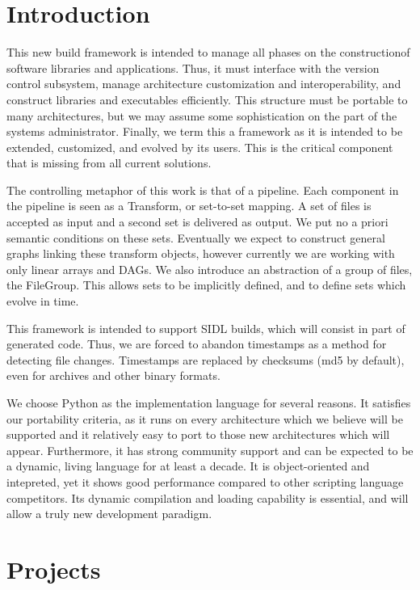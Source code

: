 \section{Introduction}

This new build framework is intended to manage all phases on the constructionof software libraries and
applications. Thus, it must interface with the version control subsystem, manage architecture customization and
interoperability, and construct libraries and executables efficiently. This structure must be portable to many
architectures, but we may assume some sophistication on the part of the systems administrator. Finally, we term this a
framework as it is intended to be extended, customized, and evolved by its users. This is the critical component that is
missing from all current solutions.

The controlling metaphor of this work is that of a pipeline. Each component in the pipeline is seen as a Transform, or
set-to-set mapping. A set of files is accepted as input and a second set is delivered as output. We put no a priori
semantic conditions on these sets. Eventually we expect to construct general graphs linking these transform objects,
however currently we are working with only linear arrays and DAGs. We also introduce an abstraction of a group of files,
the FileGroup. This allows sets to be implicitly defined, and to define sets which evolve in time.

This framework is intended to support SIDL builds, which will consist in part of generated code. Thus, we are forced to
abandon timestamps as a method for detecting file changes. Timestamps are replaced by checksums (md5 by default), even
for archives and other binary formats.

We choose Python as the implementation language for several reasons. It satisfies our portability criteria, as it runs
on every architecture which we believe will be supported and it relatively easy to port to those new architectures which
will appear. Furthermore, it has strong community support and can be expected to be a dynamic, living language for at
least a decade. It is object-oriented and intepreted, yet it shows good performance compared to other scripting language
competitors. Its dynamic compilation and loading capability is essential, and will allow a truly new development paradigm.

\section{Projects}


